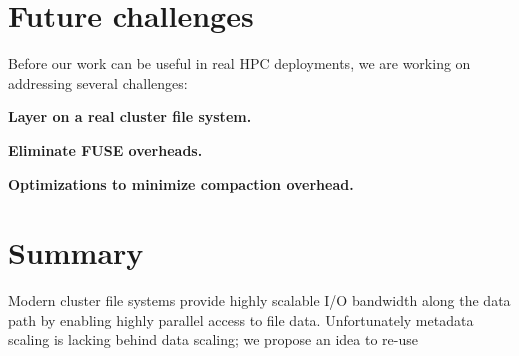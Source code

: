 \section{Future challenges}
\label{futurework}

Before our work can be useful in real HPC deployments, we are working on
addressing several challenges:

\textbf{Layer on a real cluster file system.}

\textbf{Eliminate FUSE overheads.}

\textbf{Optimizations to minimize compaction overhead.} 

\section{Summary}
\label{summary}

Modern cluster file systems provide highly scalable I/O bandwidth along the
data path by enabling highly parallel access to file data.
Unfortunately metadata scaling is lacking behind data scaling; we propose an
idea to re-use 




